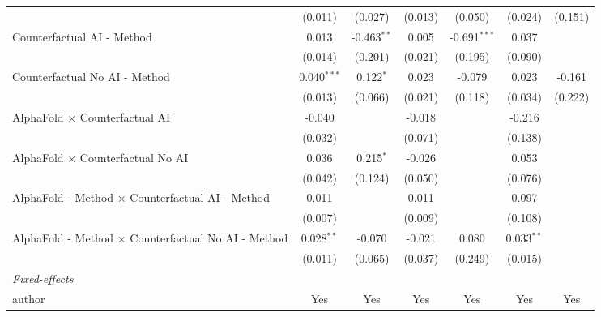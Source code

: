 \begin{tabular}{lcccccc}
                                                              & (0.011)       & (0.027)       & (0.013) & (0.050)        & (0.024)      & (0.151)\\   
   Counterfactual AI - Method                                 & 0.013         & -0.463$^{**}$ & 0.005   & -0.691$^{***}$ & 0.037        &   \\   
                                                              & (0.014)       & (0.201)       & (0.021) & (0.195)        & (0.090)      &   \\   
   Counterfactual No AI - Method                              & 0.040$^{***}$ & 0.122$^{*}$   & 0.023   & -0.079         & 0.023        & -0.161\\   
                                                              & (0.013)       & (0.066)       & (0.021) & (0.118)        & (0.034)      & (0.222)\\   
   AlphaFold $\times$ Counterfactual AI                       & -0.040        &               & -0.018  &                & -0.216       &   \\   
                                                              & (0.032)       &               & (0.071) &                & (0.138)      &   \\   
   AlphaFold $\times$ Counterfactual No AI                    & 0.036         & 0.215$^{*}$   & -0.026  &                & 0.053        &   \\   
                                                              & (0.042)       & (0.124)       & (0.050) &                & (0.076)      &   \\   
   AlphaFold - Method $\times$ Counterfactual AI - Method     & 0.011         &               & 0.011   &                & 0.097        &   \\   
                                                              & (0.007)       &               & (0.009) &                & (0.108)      &   \\   
   AlphaFold - Method $\times$ Counterfactual No AI - Method  & 0.028$^{**}$  & -0.070        & -0.021  & 0.080          & 0.033$^{**}$ &   \\   
                                                              & (0.011)       & (0.065)       & (0.037) & (0.249)        & (0.015)      &   \\   
   \midrule
   \emph{Fixed-effects}\\
   author                                                     & Yes           & Yes           & Yes     & Yes            & Yes          & Yes\\  

\end{tabular}
